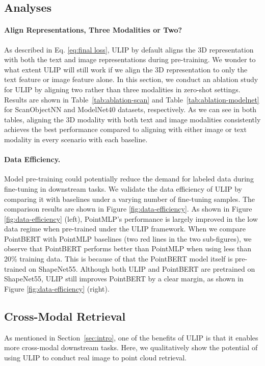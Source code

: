          
         

\subsection{Analyses}
\label{sec:more analyses}

\paragraph{Align Representations, Three Modalities or Two?}
As described in Eq. \ref{eq:final loss}, ULIP by default aligns the 3D representation with both the text and image representations during pre-training.
We wonder to what extent ULIP will still work if we align the 3D representation to only the text feature or image feature alone.
In this section,
we conduct an ablation study for ULIP by aligning two rather than three modalities in zero-shot settings.
Results are shown in Table~\ref{tab:ablation-scan} and Table~\ref{tab:ablation-modelnet} for ScanObjectNN and ModelNet40 datasets, respectively. As we can see in both tables, aligning the 3D modality with both text and image modalities consistently achieves the best performance compared to aligning with either image or text modality in every scenario with each baseline.

\vspace{-10pt}
\paragraph{Data Efficiency.}
Model pre-training could potentially reduce the demand for labeled data during fine-tuning in downstream tasks. We validate the data efficiency of ULIP by comparing it with baselines under a varying number of fine-tuning samples. The comparison results are shown in Figure \ref{fig:data-efficiency}. As shown in Figure \ref{fig:data-efficiency} (left), PointMLP's performance is largely improved in the low data regime when pre-trained under the ULIP framework. When we compare PointBERT with PointMLP baselines (two red lines in the two sub-figures), we observe that PointBERT performs better than PointMLP when using less than 20\% training data. This is because of that the PointBERT model itself is pre-trained on ShapeNet55. Although both ULIP and PointBERT are pretrained on ShapeNet55, ULIP still improves PointBERT by a clear margin, as shown in Figure \ref{fig:data-efficiency} (right).

\subsection{Cross-Modal Retrieval}
As mentioned in Section~\ref{sec:intro}, one of the benefits of ULIP is that it enables more cross-modal downstream tasks. Here, we qualitatively show the potential of using ULIP to conduct real image to point cloud retrieval. 

